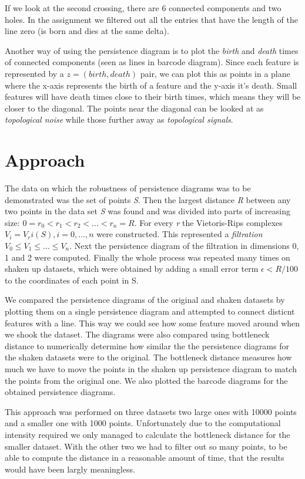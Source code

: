 \documentclass[11pt]{article}
\begin{document}
If we look at the second crossing, there are 6 connected components and two holes. In the assignment we filtered out all the entries that have the length of the line zero (is born and dies at the same delta).

Another way of using the persistence diagram is to plot the \emph{birth} and \emph{death} times of connected components (seen as lines in barcode diagram). Since each feature is represented by a $z = (birth, death)$ pair, we can plot this as points in a plane where the x-axis represents the birth of a feature and the y-axis it's death. Small features will have death times close to their birth times, which means they will be closer to the diagonal. The points near the diagonal can be looked at as \emph{topological noise} while those further away as \emph{topological signals}.


\section{Approach}

The data on which the robustness of persistence diagrams was to be demonstrated was the set of points \emph{S}. Then the largest distance \emph{R} between any two points in the data set \emph{S} was found and was divided into parts of increasing size: $0 = r_0 < r_1 < r_2 < ... < r_n = R$. For every \emph{r} the Vietoris-Rips complexes $V_i = V_ri(S), i = 0,...,n$ were constructed. This represented a \emph{filtration} $V_0 \leq V_1 \leq ... \leq V_n$. Next the persistence diagram of the filtration in dimensions 0, 1 and 2 were computed. Finally the whole process was repeated many times on shaken up datasets, which were obtained by adding a small error term $\epsilon < R/100$ to the coordinates of each point in S.

We compared the persistence diagrams of the original and shaken datasets by plotting them on a single persistence diagram and attempted to connect disticnt features with a line. This way we could see how some feature moved around when we shook the dataset. The diagrams were also compared using bottleneck distance to numerically determine how similar the the persistence diagrams for the shaken datasets were to the original. The bottleneck distance measures how much we have to move the points in the shaken up persistence diagram to match the points from the original one. We also plotted the barcode diagrams for the obtained persistence diagrams.

This approach was performed on three datasets two large ones with 10000 points and a smaller one with 1000 points. Unfortunately due to the computational intensity required we only managed to calculate the bottleneck distance for the smaller dataset. With the other two we had to filter out so many points, to be able to compute the distance in a reasonable amount of time, that the results would have been largly meaningless. 
\end{document}
